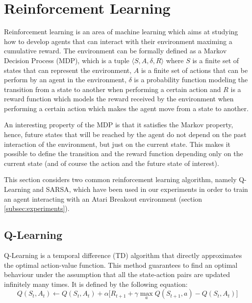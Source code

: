 \section{Reinforcement Learning}
Reinforcement learning \cite{Suttonrl18} is an area of machine learning
which aims at studying how to develop agents that can interact with
their environment maximing a cumulative reward. The environment can be
formally defined as a Markov Decision Process (MDP), which is a tuple
$\langle S, A, \delta, R \rangle$ where $S$ is a finite set of states that can represent
the environment, $A$ is a finite set of actions that can be perform by
an agent in the environment, $\delta$ is a probability function modeling
the transition from a state to another when performing a certain action and
$R$ is a reward function which models the reward received by the environment
when performing a certain action which makes the agent move from a state
to another.

An interesting property of the MDP is that it satisfies the Markov property,
hence, future states that will be reached by the agent do not depend
on the past interaction of the environment, but just on the current state.
This makes it possible to define the transition and the reward function
depending only on the current state (and of course the action and the future
state of interest).

This section considers two common reinforcement learning algorithm,
namely Q-Learning and SARSA, which have been used in our experiments
in order to train an agent interacting with an Atari Breakout environment
(section \ref{subsec:experiments}).

\subsection{Q-Learning}
Q-Learning is a temporal difference (TD) algorithm that directly approximates
the optimal action-value
function. This method guarantees to find an optimal behaviour under the
assumption that all the state-action pairs are updated infinitely many times. It is
defined \cite{Suttonrl18} by the following equation:
\begin{equation}
    \label{eq:qlearning-update-function}
    Q(S_t, A_t) \leftarrow Q(S_t, A_t) + \alpha \Big[ R_{t+1} +
        \gamma \max_{a} Q(S_{t+1}, a) - Q(S_t, A_t) \Big]
\end{equation}

